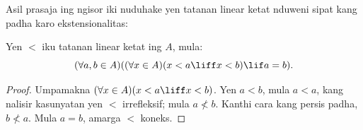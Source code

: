 \documentclass[../../../include/open-logic-section]{subfiles}
\begin{document}
Asil prasaja ing ngisor iki nuduhake yen
tatanan linear ketat nduweni sipat kang
padha karo ekstensionalitas:

\begin{prop}
Yen $<$ iku tatanan linear ketat ing $A$, mula:
\[
  (\forall a, b \in A)((\forall x \in A)(x < a \liff x < b) \lif a = b).
\]
\end{prop}

\begin{proof}
Umpamakna $(\forall x \in A)(x < a \liff x < b)$.
Yen $a < b$, mula $a <a$,
kang nalisir kasunyatan yen $<$ irrefleksif;
mula $a \nless b$.
Kanthi cara kang persis padha, $b \nless a$.
Mula $a = b$, amarga $<$ koneks.
\end{proof}
\end{document}
